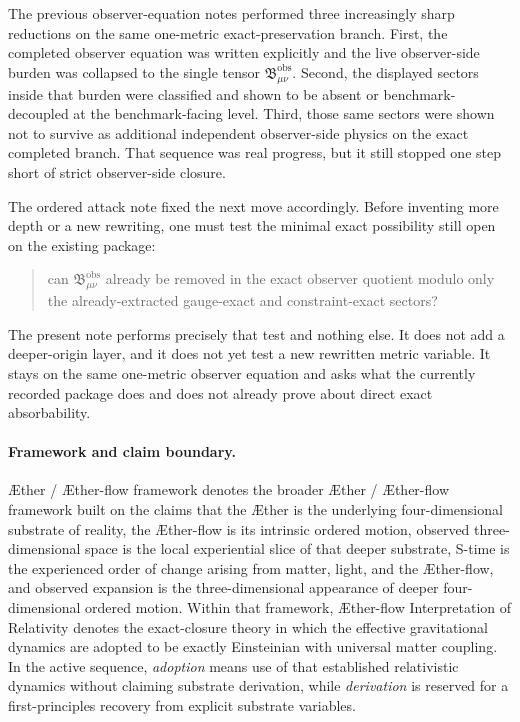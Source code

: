 \documentclass[11pt]{article}
\newcommand{\Aether}{\AE{}ther}
\newcommand{\Aflow}{\AE{}ther-flow}
\newcommand{\TheoryName}{\Aflow{} Interpretation of Relativity}
\newcommand{\TheoryProgram}{\Aether{} / \Aflow{} framework}
\newcommand{\ObsBurden}{\mathfrak B_{\mu\nu}^{\mathrm{obs}}}
\begin{document}
The previous observer-equation notes performed three increasingly sharp reductions on the same one-metric exact-preservation branch. First, the completed observer equation was written explicitly and the live observer-side burden was collapsed to the single tensor \(\ObsBurden\). Second, the displayed sectors inside that burden were classified and shown to be absent or benchmark-decoupled at the benchmark-facing level. Third, those same sectors were shown not to survive as additional independent observer-side physics on the exact completed branch. That sequence was real progress, but it still stopped one step short of strict observer-side closure.

The ordered attack note fixed the next move accordingly. Before inventing more depth or a new rewriting, one must test the minimal exact possibility still open on the existing package:
\begin{quote}
can \(\ObsBurden\) already be removed in the exact observer quotient modulo only the already-extracted gauge-exact and constraint-exact sectors?
\end{quote}
The present note performs precisely that test and nothing else. It does not add a deeper-origin layer, and it does not yet test a new rewritten metric variable. It stays on the same one-metric observer equation and asks what the currently recorded package does and does not already prove about direct exact absorbability.

\paragraph{Framework and claim boundary.}
\TheoryProgram{} denotes the broader \Aether{} / \Aflow{} framework built on the claims that the \Aether{} is the underlying four-dimensional substrate of reality, the \Aflow{} is its intrinsic ordered motion, observed three-dimensional space is the local experiential slice of that deeper substrate, S-time is the experienced order of change arising from matter, light, and the \Aflow{}, and observed expansion is the three-dimensional appearance of deeper four-dimensional ordered motion. Within that framework, \TheoryName{} denotes the exact-closure theory in which the effective gravitational dynamics are adopted to be exactly Einsteinian with universal matter coupling. In the active sequence, \emph{adoption} means use of that established relativistic dynamics without claiming substrate derivation, while \emph{derivation} is reserved for a first-principles recovery from explicit substrate variables.
\end{document}

